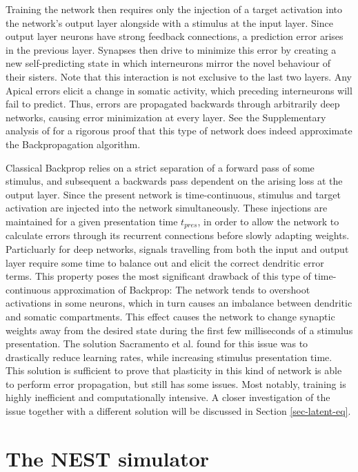 Training the network then requires only the injection of a target activation into the network's output layer alongside
with a stimulus at the input layer. Since output layer neurons have strong feedback connections, a prediction error
arises in the previous layer. Synapses then drive to minimize this error by creating a new self-predicting state in
which interneurons mirror the novel behaviour of their sisters. Note that this interaction is not exclusive to the last
two layers. Any Apical errors elicit a change in somatic activity, which preceding interneurons will fail to predict.
Thus, errors are propagated backwards through arbitrarily deep networks, causing error minimization at every layer. See
the Supplementary analysis of \citep{sacramento2018dendritic} for a rigorous proof that this type of network does indeed
approximate the Backpropagation algorithm.



Classical Backprop relies on a strict separation of a forward pass of some stimulus, and subsequent a backwards pass
dependent on the arising loss at the output layer. Since the present network is time-continuous, stimulus and target
activation are injected into the network simultaneously. These injections are maintained for a given presentation time
$t_{pres}$, in order to allow the network to calculate errors through its recurrent connections before slowly adapting
weights. Particluarly for deep networks, signals travelling from both the input and output layer require some time to
balance out and elicit the correct dendritic error terms. This property poses the most significant drawback of this type
of time-continuous approximation of Backprop: The network tends to overshoot activations in some neurons, which in turn
causes an imbalance between dendritic and somatic compartments. This effect causes the network to change synaptic
weights away from the desired state during the first few milliseconds of a stimulus presentation. The solution
Sacramento et al. found for this issue was to drastically reduce learning rates, while increasing stimulus presentation
time. This solution is sufficient to prove that plasticity in this kind of network is able to perform error propagation,
but still has some issues. Most notably, training is highly inefficient and computationally intensive. A closer
investigation of the issue together with a different solution will be discussed in Section \ref{sec-latent-eq}.



\section{The NEST simulator}

